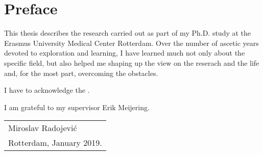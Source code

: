%
% 

\chpos{14mm}{10mm}
\chapter*{Preface}

This thesis describes the research carried out as part of my Ph.D. study at the Erasmus University Medical Center Rotterdam. Over the number of ascetic years devoted to exploration and learning, I have learned much not only about the specific field, but also helped me shaping up the view on the reserach and the life and, for the most part, overcoming the obstacles.

I have to acknowledge the . 

I am grateful to my supervisor Erik Meijering.




\bigskip
\begin{flushright}
  \begin{tabular}{@{}l@{}}
    Miroslav Radojevi\'{c}\\
    Rotterdam, January 2019.
  \end{tabular}
\end{flushright}
